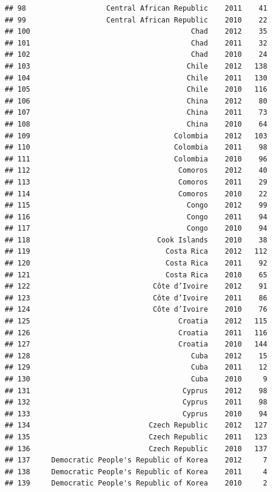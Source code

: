\documentclass[
]{book}
\begin{document}
\begin{verbatim}
## 98                   Central African Republic    2011    41
## 99                   Central African Republic    2010    22
## 100                                      Chad    2012    35
## 101                                      Chad    2011    32
## 102                                      Chad    2010    24
## 103                                     Chile    2012   138
## 104                                     Chile    2011   130
## 105                                     Chile    2010   116
## 106                                     China    2012    80
## 107                                     China    2011    73
## 108                                     China    2010    64
## 109                                  Colombia    2012   103
## 110                                  Colombia    2011    98
## 111                                  Colombia    2010    96
## 112                                   Comoros    2012    40
## 113                                   Comoros    2011    29
## 114                                   Comoros    2010    22
## 115                                     Congo    2012    99
## 116                                     Congo    2011    94
## 117                                     Congo    2010    94
## 118                              Cook Islands    2010    38
## 119                                Costa Rica    2012   112
## 120                                Costa Rica    2011    92
## 121                                Costa Rica    2010    65
## 122                             Côte d’Ivoire    2012    91
## 123                             Côte d’Ivoire    2011    86
## 124                             Côte d’Ivoire    2010    76
## 125                                   Croatia    2012   115
## 126                                   Croatia    2011   116
## 127                                   Croatia    2010   144
## 128                                      Cuba    2012    15
## 129                                      Cuba    2011    12
## 130                                      Cuba    2010     9
## 131                                    Cyprus    2012    98
## 132                                    Cyprus    2011    98
## 133                                    Cyprus    2010    94
## 134                            Czech Republic    2012   127
## 135                            Czech Republic    2011   123
## 136                            Czech Republic    2010   137
## 137     Democratic People's Republic of Korea    2012     7
## 138     Democratic People's Republic of Korea    2011     4
## 139     Democratic People's Republic of Korea    2010     2

\end{verbatim}
\end{document}
